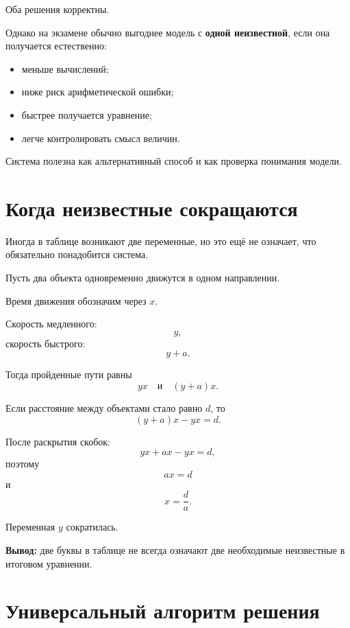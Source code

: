 \documentclass[a4paper,12pt]{article}
\newcommand{\key}[1]{\textcolor{darkaccent}{\textbf{#1}}}
\begin{document}
Оба решения корректны.

Однако на экзамене обычно выгоднее модель с
\key{одной неизвестной}, если она получается естественно:
\begin{itemize}
    \item меньше вычислений;
    \item ниже риск арифметической ошибки;
    \item быстрее получается уравнение;
    \item легче контролировать смысл величин.
\end{itemize}

Система полезна как альтернативный способ и как проверка понимания модели.


\section{Когда неизвестные сокращаются}

Иногда в таблице возникают две переменные, но это ещё не означает,
что обязательно понадобится система.

Пусть два объекта одновременно движутся в одном направлении.

Время движения обозначим через \(x\).

Скорость медленного:
\[
y,
\]
скорость быстрого:
\[
y+a.
\]

Тогда пройденные пути равны
\[
yx
\quad\text{и}\quad
(y+a)x.
\]

Если расстояние между объектами стало равно \(d\), то
\[
(y+a)x-yx=d.
\]

После раскрытия скобок:
\[
yx+ax-yx=d,
\]
поэтому
\[
ax=d
\]
и
\[
\boxed{x=\frac da}.
\]

Переменная \(y\) сократилась.

\key{Вывод:}
две буквы в таблице не всегда означают две необходимые неизвестные
в итоговом уравнении.


\section{Универсальный алгоритм решения}
\end{document}
